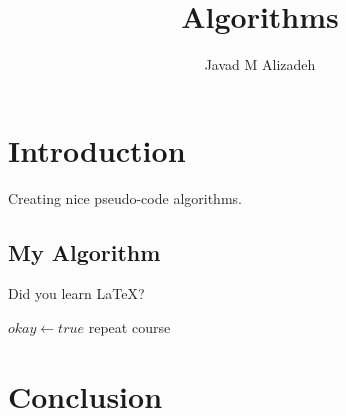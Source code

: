 \documentclass{article}
\title{Algorithms}
\author{Javad M Alizadeh}
\date{}
\begin{document}
\maketitle
	
\section{Introduction}

Creating nice pseudo-code algorithms.


\subsection{My Algorithm}

Did you learn \LaTeX?

\begin{algorithmic}
		\State $okay \gets true$
	\Else
			\State repeat course
		\EndWhile
	\EndIf
\end{algorithmic}
	

\subsection{}
	
	
\section{Conclusion}
	
	
\end{document}
